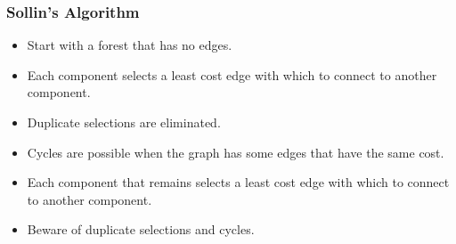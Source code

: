 \documentclass[newPxFont,sthlmFooter,nooffset]{beamer}
\begin{document}
\begin{frame}[t]
  \frametitle{Sollin's Algorithm}
  \begin{itemize}
  \item Start with a forest that has no edges.
  \item Each component selects a least cost edge with which to connect
    to another component.
  \item Duplicate selections are eliminated.
  \item Cycles are possible when the graph has some edges that have
    the same cost.
  \item Each component that remains selects a least cost edge with which to connect to another component. 
  \item Beware of duplicate selections and cycles.
  \end{itemize}
\begin{columns}
  \begin{column}{0.5\textwidth}
\begin{center}
\end{center}    
  \end{column}
  \begin{column}{0.5\textwidth}
\begin{center}
\end{center}        
  \end{column}
\end{columns}

\end{frame}
\end{document}
